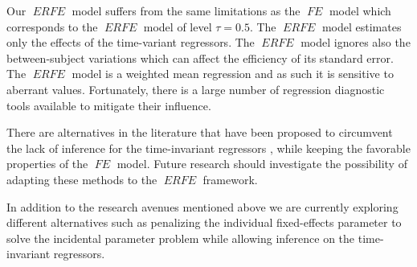 \documentclass[15pt,a4paper]{article}
\DeclareMathOperator{\ERFE}{\textit{ERFE}}
\DeclareMathOperator{\FE}{\textit{FE}}
\begin{document}
Our $\ERFE$ model suffers from the same limitations as the $\FE$ model which corresponds to the $\ERFE$ model of level $\tau = 0.5.$ 
The $\ERFE$ model estimates only the effects of the time-variant regressors. The $\ERFE$ model ignores also the between-subject variations which can affect the efficiency of its standard error. The $\ERFE$ model is a weighted mean regression and as such it is sensitive to aberrant values. Fortunately, there is a large number of regression diagnostic tools available to mitigate their influence.

There are alternatives in the literature that have been proposed to circumvent the lack of inference for the time-invariant regressors
\citep{CornwellRupert1988, BaltagiKhantiAkom1990}, while keeping the favorable properties of the $\FE$ model. Future research should investigate the possibility of adapting these methods to the $\ERFE$ framework. 

In addition to the research avenues mentioned above we are currently exploring different alternatives such as penalizing the individual fixed-effects parameter to solve the incidental parameter problem while allowing inference on the time-invariant regressors.



\clearpage


\end{document}
